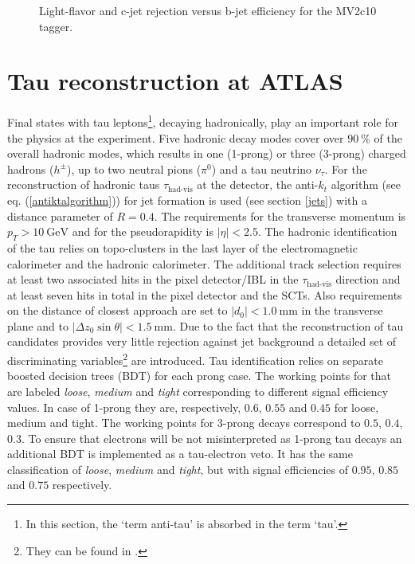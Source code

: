 \begin{figure}
\begin{subfigure}[t]{0.49\textwidth}
  \end{subfigure}
 \caption[Light-flavor (a) and c-jet rejection (b) versus b-jet efficiency for the MV2c10 tagger.]{Light-flavor and c-jet rejection versus b-jet efficiency for the MV2c10 tagger. \cite{MV2c10}}
 \label{btageff}
\end{figure}
\section{Tau reconstruction at ATLAS}\label{taus}
Final states with tau leptons\footnote{In this section, the `term anti-tau' is absorbed in the term `tau'.}, decaying hadronically, play an important role for the physics at the {\ATLAS} experiment.  Five hadronic decay modes cover over $\SI{90}{\percent}$ of the overall hadronic modes, which results in one (1-prong) or three (3-prong) charged hadrons ($h^\pm$), up to two neutral pions ($\pi^0$) and a tau neutrino $\nu_\tau$. \cite{tauPerformance2} 
For the reconstruction of hadronic taus $\tau_\text{had-vis}$ at the {\ATLAS} detector, the anti-$k_t$ algorithm (see eq. (\ref{antiktalgorithm})) for jet formation is used (see section \ref{jets}) with a distance parameter of $R=0.4$. The requirements for the transverse momentum is $p_T>\SI{10}{\giga\electronvolt}$ and for the pseudorapidity is $|\eta|<2.5$. The hadronic identification of the tau relies on topo-clusters in the last layer of the electromagnetic calorimeter and the hadronic calorimeter. The additional track selection requires at least two associated hits in the pixel detector/IBL in the $\tau_\text{had-vis}$ direction and at least seven hits in total in the pixel detector and the SCTs. Also requirements on the distance of closest approach are set to $|d_0|<\SI{1.0}{\milli\meter}$ in the transverse plane and to $|\Delta z_0\sin\theta|<\SI{1.5}{\milli\meter}$.\cite{tauPerformance}\newline
Due to the fact that the reconstruction of tau candidates provides very little rejection against jet background a detailed set of discriminating variables\footnote{They can be found in \cite{tauPerformance}.} are introduced. Tau identification relies on separate boosted decision trees (BDT) for each prong case. The working points for that are labeled \textit{loose}, \textit{medium} and \textit{tight} corresponding to different signal efficiency values. In case of 1-prong they are, respectively, $0.6$, $0.55$ and $0.45$ for loose, medium and tight. The working points for 3-prong decays correspond to $0.5$, $0.4$, $0.3$. \cite{tauPerformance}\newline
To ensure that electrons will be not misinterpreted as 1-prong tau decays an additional BDT is implemented as a tau-electron veto. It has the same classification of \textit{loose}, \textit{medium} and \textit{tight}, but with signal efficiencies of $0.95$, $0.85$ and $0.75$ respectively. \cite{elBDT}
%
%
